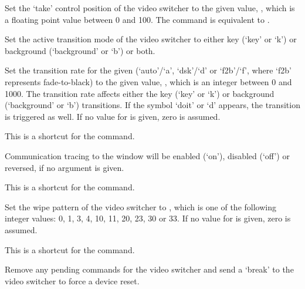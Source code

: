   Set the `take' control position of the video switcher to the given value, ,
  which is a floating point value between 0 and 100.
  The command is equivalent to .

  Set the active transition mode of the video switcher to either key (`key' or `k') or background
  (`background' or `b') or both.

  Set the transition rate for the given  (`auto'/`a', `dsk'/`d' or `f2b'/`f',
  where `f2b' represents fade-to-black) to the given value, ,
  which is an integer between 0 and 1000.
  The transition rate affects either the key (`key' or `k') or background (`background' or `b')
  transitions.
  If the symbol `doit' or `d' appears, the transition is triggered as well.
  If no value for  is given, zero is assumed.

  This is a shortcut for the  command.

  Communication tracing to the \MaxName{} window will be enabled (`on'), disabled (`off') or reversed,
  if no argument is given.

  This is a shortcut for the  command.

  Set the wipe pattern of the video switcher to , which is one of the following
  integer values: 0, 1, 3, 4, 10, 11, 20, 23, 30 or 33.
  If no value for  is given, zero is assumed.

  This is a shortcut for the  command.

  Remove any pending commands for the video switcher and send a `break' to the video switcher to
  force a device reset.
  
  \objListCmdEnd

\objItemFile

\objItemMessage


